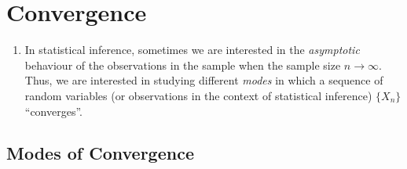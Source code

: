 \section{Convergence}
\label{sect:convergence}
\begin{enumerate}
\item \label{it:asym-stat-infer}
In statistical inference, sometimes we are interested in the
\emph{asymptotic} behaviour of the observations in the sample when the sample
size \(n\to\infty\). Thus, we are interested in studying different \emph{modes}
in which a sequence of random variables (or observations in the context of
statistical inference) \(\{X_n\}\) ``converges''.
\end{enumerate}
\subsection{Modes of Convergence}

